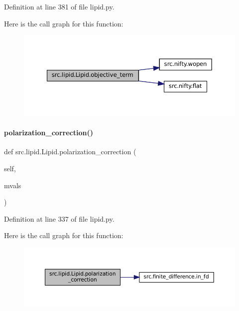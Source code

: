 Definition at line 381 of file lipid.\+py.

Here is the call graph for this function\+:
\nopagebreak
\begin{figure}[H]
\begin{center}
\leavevmode
\includegraphics[width=350pt]{classsrc_1_1lipid_1_1Lipid_a6c3b17049534baa97adc428f2e60c4d7_cgraph}
\end{center}
\end{figure}
\mbox{\label{classsrc_1_1lipid_1_1Lipid_a1f3a778454c17956bee3e2fbc82ed41d}} 
\paragraph{\texorpdfstring{polarization\+\_\+correction()}{polarization\_correction()}}
{\footnotesize\ttfamily def src.\+lipid.\+Lipid.\+polarization\+\_\+correction (\begin{DoxyParamCaption}\item[{}]{self,  }\item[{}]{mvals }\end{DoxyParamCaption})}



Definition at line 337 of file lipid.\+py.

Here is the call graph for this function\+:
\nopagebreak
\begin{figure}[H]
\begin{center}
\leavevmode
\includegraphics[width=350pt]{classsrc_1_1lipid_1_1Lipid_a1f3a778454c17956bee3e2fbc82ed41d_cgraph}
\end{center}
\end{figure}
\mbox{\label{classsrc_1_1lipid_1_1Lipid_a0571b5cf5b10a169eb7afee468dd3a61}} 
